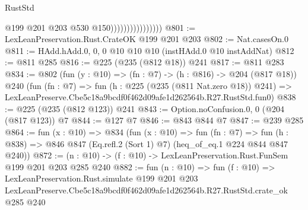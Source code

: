 \begin{lexlean}{RustStd}
\begin{coremodule}
                                    @199
                                    @201
                                    @203
                                    @530
                                    @150))))))))))))))))
@801 := LexLeanPreservation.Rust.CrateOK @199 @201 @203
@802 := Nat.casesOn.{0}
@811 := HAdd.hAdd.{0, 0, 0} @10 @10 @10 (instHAdd.{0} @10 instAddNat)
@812 := @811 @285
@816 := @225 (@235 (@812 @18)) @241
@817 := @811 @283
@834 := @802
    (fun (y : @10) => (fn : @7) -> (h : @816) -> @204 (@817 @18))
    @240
    (fun (fn : @7) =>
    fun (h : @225 (@235 (@811 Nat.zero @18)) @241) =>
    LexLeanPreserve.Cbe5c18a9bcdf0f462d09afe1d262564b.R27.RustStd.fun0)
@838 := @225 (@235 (@812 @123)) @241
@843 := Option.noConfusion.{0, 0} (@204 (@817 @123)) @7
@844 := @127 @7
@846 := @843 @844 @7
@847 := @239 @285
@864 := fun (x : @10) =>
  @834
    (fun (x : @10) =>
    fun (fn : @7) =>
    fun (h : @838) => @846 @847 (Eq.refl.{2} (Sort 1) @7) (heq_of_eq.{1} @224 @844 @847 @240))
@872 := (n : @10) -> (f : @10) -> LexLeanPreservation.Rust.FunSem @199 @201 @203 @285 @240
@882 := fun (n : @10) =>
  fun (f : @10) =>
  LexLeanPreservation.Rust.simulate
    @199
    @201
    @203
    LexLeanPreserve.Cbe5c18a9bcdf0f462d09afe1d262564b.R27.RustStd.crate_ok
    @285
    @240
\end{coremodule}
\end{lexlean}
